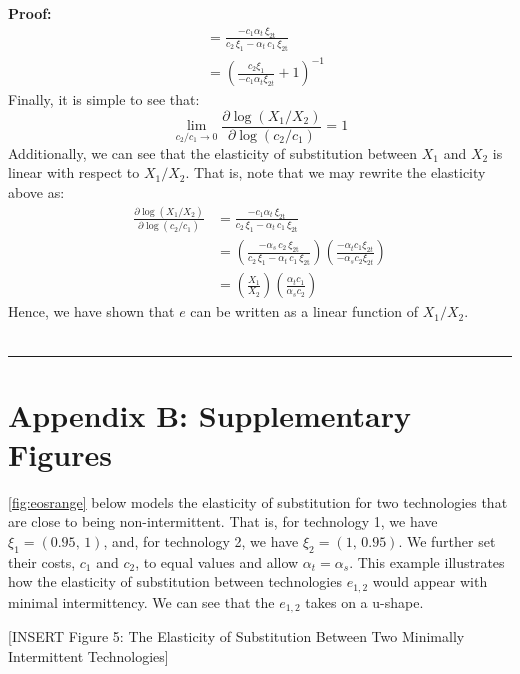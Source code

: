 \documentclass[11pt,a4paper,leqno]{extarticle}
\newenvironment{proof}[1][Proof]{\noindent\textbf{#1:} }{\ \rule{0.5em}{0.5em}}
\begin{document}
\begin{proof}
\begin{align*}
		&= \frac{-c_1 \alpha _{t}\,\xi _{\mathrm{2t}}}{c_2\,\xi_1-\alpha _{t}\,c_{1}\,\xi _{\mathrm{2t}}}\\
		&= \left( \frac{c_2 \xi_1 }{-c_1 \alpha_t \xi_{2t}} + 1 \right)^{-1}
		\end{align*}
		Finally, it is simple to see that:
		$$ \lim_{c_2/c_1 \to 0} \frac{\partial \log(X_1/X_2)}{\partial \log(c_2/c_1)} = 1$$
		Additionally, we can see that the elasticity of substitution between $X_1$ and $X_2$ is linear with respect to $X_1/X_2$. That is, note that we may rewrite the elasticity above as:
		\begin{align*}
		\frac{\partial \log(X_1/X_2)}{\partial \log(c_2/c_1)} &= \frac{-c_1 \alpha _{t}\,\xi _{\mathrm{2t}}}{c_2\,\xi_1-\alpha _{t}\,c_{1}\,\xi _{\mathrm{2t}}} \\
		&= \left( \frac{-\alpha _{s}\,c_{2}\,\xi _{\mathrm{2t}}}{c_2\,\xi_1-\alpha _{t}\,c_{1}\,\xi _{\mathrm{2t}}} \right) \left( \frac{- \alpha_t c_1 \xi_{2t} }{- \alpha_s c_2 \xi_{2t}} \right)\\
		&= \left( \frac{X_1}{X_2} \right) \left( \frac{ \alpha_t c_1  }{\alpha_s c_2 } \right)
		\end{align*}
		Hence, we have shown that $e$ can be written as a linear function of $X_1/X_2$. 
		\\ \hfill
	\end{proof}
	
	
	\pagebreak
	
	
	
	
	
	\section{Appendix B: Supplementary Figures}
	\label{sec:AppendixB}
	
	
	\autoref{fig:eosrange} below models the elasticity of substitution for two technologies that are close to being non-intermittent. That is, for technology 1, we have $\xi_1 = (0.95,\, 1)$, and, for technology 2, we have $\xi_2 = (1, \,0.95)$. We further set their costs, $c_1$ and $c_2$, to equal values and allow $\alpha_t = \alpha_s$. This example illustrates how the elasticity of substitution between technologies $e_{1,2}$ would appear with minimal intermittency. We can see that the $e_{1,2}$ takes on a u-shape. 
	
	
	
	\vspace{0.15in}
	\begin{center}
		[INSERT Figure 5: The Elasticity of Substitution Between Two  Minimally Intermittent Technologies]
	\end{center}
	\vspace{0.15in}
	
\end{document}
